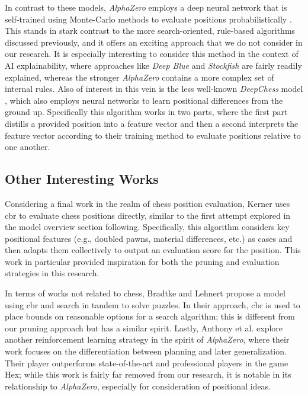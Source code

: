 \documentclass[letterpaper]{article}
\begin{document}
In contrast to these models, \textit{AlphaZero} employs a deep neural network that is self-trained using Monte-Carlo methods to evaluate positions probabilistically \cite{silver-et-al17}.  This stands in stark contrast to the more search-oriented, rule-based algorithms discussed previously, and it offers an exciting approach that we do not consider in our research.  It is especially interesting to consider this method in the context of AI explainability, where approaches like \textit{Deep Blue} and \textit{Stockfish} are fairly readily explained, whereas the stronger \textit{AlphaZero} contains a more complex set of internal rules.  Also of interest in this vein is the less well-known \textit{DeepChess} model \cite{david-et-al2016}, which also employs neural networks to learn positional differences from the ground up.   Specifically this algorithm works in two parts, where the first part distills a provided position into a feature vector and then a second interprets the feature vector according to their training method to evaluate positions relative to one another.

\subsection{Other Interesting Works}
Considering a final work in the realm of chess position evaluation, Kerner \cite{Kerner94} uses \acrshort{cbr} to evaluate chess positions directly, similar to the first attempt explored in the model overview section following.  Specifically, this algorithm considers key positional features (e.g., doubled pawns, material differences, etc.) as cases and then adapts them collectively to output an evaluation score for the position.  This work in particular provided inspiration for both the pruning and evaluation strategies in this research.

In terms of works not related to chess, Bradtke and Lehnert \cite{bradtke-lehnert88} propose a model using \acrshort{cbr} and search in tandem to solve puzzles.  In their approach, \acrshort{cbr} is used to place bounds on reasonable options for a search algorithm; this is different from our pruning approach but has a similar spirit.  Lastly, Anthony et al. \cite{anthony-et-al2017} explore another reinforcement learning strategy in the spirit of \textit{AlphaZero}, where their work focuses on the differentiation between planning and later generalization.  Their player outperforms state-of-the-art and professional players in the game Hex; while this work is fairly far removed from our research, it is notable in its relationship to \textit{AlphaZero}, especially for consideration of positional ideas.
\end{document}
